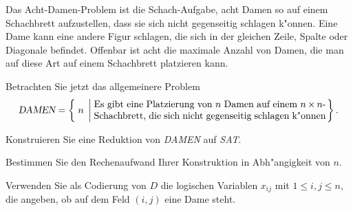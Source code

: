 Das Acht-Damen-Problem ist die Schach-Aufgabe, acht Damen so auf einem
Schachbrett aufzustellen, dass sie sich nicht gegenseitig schlagen k"onnen.
Eine Dame kann eine andere Figur schlagen, die sich in der gleichen Zeile,
Spalte oder Diagonale befindet.
Offenbar ist acht die maximale Anzahl von Damen, die man auf diese Art auf
einem Schachbrett platzieren kann.

Betrachten Sie jetzt das allgemeinere Problem
\[
\textsl{DAMEN}
=
\left\{\; n
\;\left|\;
\begin{minipage}{0.7\hsize}
Es gibt eine Platzierung von $n$ Damen auf einem $n\times n$-Schachbrett,
die sich nicht gegenseitig schlagen k"onnen
\end{minipage}\right.\right\}.
\]
\begin{teilaufgaben}
\item
Konstruieren Sie eine Reduktion von \textsl{DAMEN} auf \textsl{SAT}.
\item
Bestimmen Sie den Rechenaufwand Ihrer Konstruktion in Abh"angigkeit von $n$.
\end{teilaufgaben}

\begin{hinweis}
Verwenden Sie als Codierung von $D$ die logischen Variablen $x_{ij}$
mit $1\le i,j\le n$, die angeben, ob auf dem Feld $(i,j)$ eine Dame
steht.
\end{hinweis}

